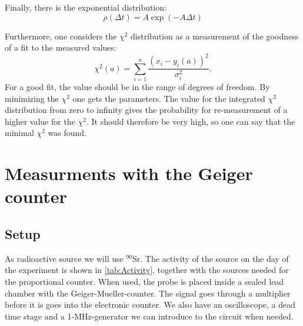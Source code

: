 Finally, there is the exponential distribution:
\begin{equation}\label{eq:exp}
	\rho(\Delta t)= A\exp(-A\Delta t)
\end{equation}


Furthermore, one considers the $\chi^2$ distribution as a measurement of the goodness of a fit to the measured values:
$$\chi^2(a)=\sum_{i=1}^{n}{\dfrac{(x_i-y_i(a))^2}{\sigma_i^2}}.$$
For a good fit, the value should be in the range of degrees of freedom.
By minimizing the $\chi^2$ one gets the parameters.
The value for the integrated $\chi^2$ distribution from zero to infinity gives the probability for re-measurement of a higher value for the $\chi^2$.
It should therefore be very high, so one can say that the minimal $\chi^2$ was found.

\section{Measurments with the Geiger counter}

\subsection{Setup} \label{sec:GM}

As radioactive source we will use ${}^{90}$Sr. The activity of the source on the day of the experiment is shown in \cref{tab:Activity}, together with the sources needed for the proportional counter. When used, the probe is placed inside a sealed lead chamber with the Geiger-Mueller-counter. The signal goes through a multiplier before it is goes into the electronic counter. We also have an oscilloscope, a dead time stage and a 1-MHz-generator we can introduce to the circuit when needed.

